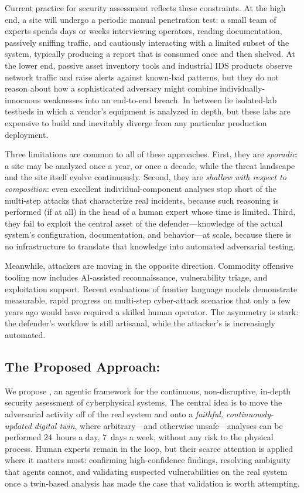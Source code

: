 Current practice for \cps security assessment reflects these
constraints. At the high end, a site will undergo a periodic manual
penetration test: a small team of experts spends days or weeks
interviewing operators, reading documentation, passively sniffing
traffic, and cautiously interacting with a limited subset of the system,
typically producing a report that is consumed once and then shelved. At
the lower end, passive asset inventory tools and industrial IDS
products observe network traffic and raise alerts against known-bad
patterns, but they do not reason about how a sophisticated adversary
might combine individually-innocuous weaknesses into an end-to-end
breach. In between lie isolated-lab testbeds in which a vendor's
equipment is analyzed in depth, but these labs are expensive to build
and inevitably diverge from any particular production deployment.

Three limitations are common to all of these approaches. First, they
are \emph{sporadic}: a site may be analyzed once a year, or once a
decade, while the threat landscape and the site itself evolve
continuously. Second, they are \emph{shallow with respect to
composition}: even excellent individual-component analyses stop short
of the multi-step attacks that characterize real incidents, because
such reasoning is performed (if at all) in the head of a human expert
whose time is limited. Third, they fail to exploit the central asset
of the defender---knowledge of the actual system's configuration,
documentation, and behavior---at scale, because there is no
infrastructure to translate that knowledge into automated adversarial
testing.

Meanwhile, attackers are moving in the opposite direction. Commodity
offensive tooling now includes AI-assisted reconnaissance, vulnerability
triage, and exploitation support. Recent evaluations of frontier
language models demonstrate measurable, rapid progress on multi-step
cyber-attack scenarios that only a few years ago would have required
a skilled human operator. The asymmetry is stark: the defender's
workflow is still artisanal, while the attacker's is increasingly
automated.

\subsection{The Proposed Approach: \sysname}
\label{sec:intro-approach}

We propose \sysname, an agentic framework for the continuous,
non-disruptive, in-depth security assessment of cyberphysical systems.
The central idea is to move the adversarial activity off of the real
system and onto a \emph{faithful, continuously-updated digital twin},
where arbitrary---and otherwise unsafe---analyses can be performed
24~hours a day, 7~days a week, without any risk to the physical process.
Human experts remain in the loop, but their scarce attention is applied
where it matters most: confirming high-confidence findings, resolving
ambiguity that agents cannot, and validating suspected vulnerabilities
on the real system once a twin-based analysis has made the case that
validation is worth attempting.

